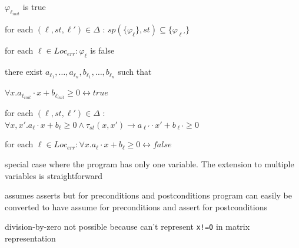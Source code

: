 \documentclass[a4paper]{article}
\begin{document}
\begin{minipage}[t]{0.16\linewidth}
\begin{betterlist}
{{\begin{betterlist}
\begin{betterlist}
						\begin{betterlist}
							\item $\varphi_{\ell_{init}}$ is true
							\item for each $(\ell , st, \ell ' ) \in \Delta$ : $sp(\{ \varphi_{\ell} \} , st) \subseteq \{ \varphi_{\ell'}\}$
							\item for each $\ell \in Loc_{err} : \varphi_{\ell}$ is false
						\end{betterlist}
						\item there exist $a_{\ell_1},\ldots, a_{\ell_n}, b_{\ell_1},\ldots, b_{\ell_n}$ such that
						\begin{betterlist}
							\item $\forall x. a_{\ell_{init}} \cdot  x + b_{\ell_{init}} \geq 0 \leftrightarrow true$
							\item for each $(\ell, st, \ell') \in \Delta$ : $\forall x, x' . a_{\ell} \cdot  x + b_{\ell} \geq 0 \land \tau_{st}(x, x') \rightarrow a_{\ell'} \cdot x' + b_{\ell'} \geq 0$
							\item for each $\ell \in Loc_{err} : \forall x. a_{\ell} \cdot  x + b_{\ell} \geq 0 \leftrightarrow false$
							\item special case where the program has only one variable. The extension to multiple variables is straightforward
						\end{betterlist}
					\end{betterlist}
					\item assumes asserts but for preconditions and postconditions program can easily be converted to have assume for preconditions and assert for postconditions
					\begin{betterlist}
						\item division-by-zero not possible because can't represent \texttt{x!=0} in matrix representation
					\end{betterlist}


\end{betterlist}}}
\end{betterlist}
\end{minipage}
\end{document}
